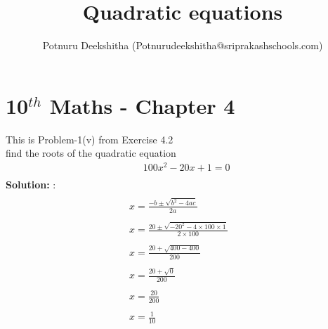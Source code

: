 \documentclass[12pt]{article}
\title{Quadratic equations}
\author{Potnuru Deekshitha (Potnurudeekshitha@sriprakashschools.com)}
\newcommand{\solution}{\noindent \textbf{Solution: }}
\begin{document}
\section*{10$^{th}$ Maths - Chapter 4}
This is Problem-1(v) from Exercise 4.2\\
find the roots of the quadratic equation\\
\begin{align*}
&{100}x^2-{20} x +{1} = 0\\
\end{align*}
\solution:\\
\begin{align*}
&\\x=\frac{-b\pm\sqrt{b^2-4ac}}{2a}\\
&\\x=\frac{20\pm\sqrt{-20^2-4 \times 100\times1}}{2 \times 100}\\
&\\x=\frac{20+\sqrt{400-400}}{200}\\
&\\x=\frac{20+\sqrt{0}}{200}\\
&\\x=\frac{20}{200}\\
&\\x=\frac{1}{10}\\
\end{align*}
\end{document}
